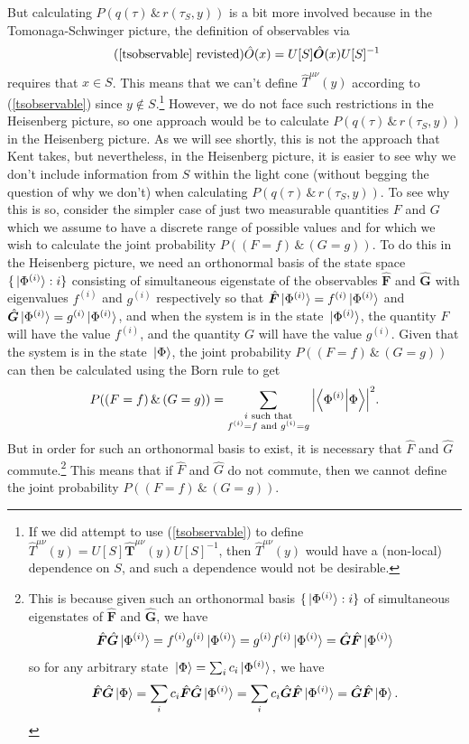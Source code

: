  But calculating $P(q(\tau) \, \&\,  r(\tau_S,y))$ is a bit more involved because in the Tomonaga-Schwinger picture, the definition of observables via 
 \begin{equation}\tag{\ref{tsobservable} revisted}
  \hat{O}(x)=U[S]\hat{\bm{O}}(x)U[S]^{-1}
\end{equation}
requires that $x\in S$.
This means that we can't define $\hat{T}^{\mu\nu}(y)$ according to (\ref{tsobservable}) since $y\not\in S$.\footnote{If we did attempt to use (\ref{tsobservable}) to define $\hat{T}^{\mu\nu}(y)=U[S]\hat{\bm{T}}^{{\mu\nu}}(y)U[S]^{-1}$, then $\hat{T}^{\mu\nu}(y)$ would have a (non-local) dependence on $S$, and such a dependence would not be desirable.} However, we do not face such restrictions in the Heisenberg picture, so one approach would be to calculate $P(q(\tau) \, \&\,  r(\tau_S,y))$ in the Heisenberg picture. As we will see shortly, this is not the approach that Kent takes, but nevertheless, in the Heisenberg picture, it is easier to see why we don't include information from $S$ within the light cone (without begging the question of why we don't) when calculating $P(q(\tau) \, \&\,  r(\tau_S,y))$. To see why this is so, consider the simpler case of just two measurable quantities ${F}$ and ${G}$ which we assume to have a discrete range of possible values and for which we wish to calculate the joint probability $P((F=f)\, \&\, (G=g))$. To do this in the Heisenberg picture, we need an orthonormal basis of the state space $\{\ket*{\Phi^{(i)}}:i\}$ consisting of simultaneous eigenstate of the observables $\hat{\bm{F}}$ and $\hat{\bm{G}}$ with eigenvalues $f^{(i)}$ and $g^{(i)}$ respectively so that $\hat{\bm{F}}\ket*{\Phi^{(i)}}=f^{(i)}\ket*{\Phi^{(i)}}$ and $\hat{\bm{G}}\ket*{\Phi^{(i)}}=g^{(i)}\ket*{\Phi^{(i)}}$, and when the system is in the state $\ket*{\Phi^{(i)}}$, the quantity $F$ will have the value $f^{(i)}$, and the quantity $G$ will have the value $g^{(i)}$. Given that the system is in the state $\ket*{\Phi}$, the joint probability $P((F=f)\, \&\, (G=g))$ can then be calculated using the Born rule to get
$$P((F=f)\, \&\, (G=g))=\sum_{\substack{i \text{ such that} \\ f^{(i)}=f \text{ and } g^{(i)}=g}}\abs{\ip{\Phi^{(i)}}{\Phi}}^2.$$
But  in order for such an orthonormal basis to exist, it is necessary that $\hat{F}$ and $\hat{G}$ commute.\footnote{This is because given such an orthonormal basis $\{\ket*{\Phi^{(i)}}:i\}$ of simultaneous eigenstates of $\hat{\bm{F}}$ and $\hat{\bm{G}}$, we have 
$$\hat{\bm{F}}\hat{\bm{G}}\ket*{\Phi^{(i)}}=f^{(i)}g^{(i)}\ket*{\Phi^{(i)}}=g^{(i)}f^{(i)}\ket*{\Phi^{(i)}}=\hat{\bm{G}}\hat{\bm{F}}\ket*{\Phi^{(i)}}$$ so for any arbitrary state $\ket*{\Phi}=\sum_i c_i \ket*{\Phi^{(i)}},$ we have 
$$\hat{\bm{F}}\hat{\bm{G}}\ket*{\Phi}=\sum_i c_i \hat{\bm{F}}\hat{\bm{G}}\ket*{\Phi^{(i)}}= \sum_i c_i \hat{\bm{G}}\hat{\bm{F}}\ket*{\Phi^{(i)}}=\hat{\bm{G}}\hat{\bm{F}}\ket*{\Phi}.$$ 
} This means that if $\hat{F}$ and $\hat{G}$ do not commute, then we cannot define the joint probability $P((F=f)\, \&\, (G=g)).$


